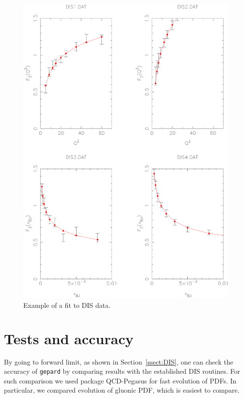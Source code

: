 \documentclass[12pt]{article}
\begin{document}
\begin{figure}
\begin{center}
\includegraphics[scale=0.72]{examplefit}
\end{center}
\caption{Example of a fit to DIS data.}
\label{fig:fitps}
\end{figure}


\section{Tests and accuracy}
\label{sec:tests}

By going to forward limit, as shown in Section~\ref{ssect:DIS}, one can check the accuracy of 
\texttt{gepard} by comparing results with the established DIS routines.
For such comparison we used package {\sc QCD-Pegasus} \cite{Vogt:2004ns} for fast evolution of PDFs.
In particular, we compared evolution of gluonic PDF, which is easiest to compare.
\end{document}
